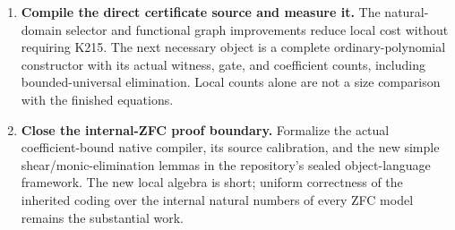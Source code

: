 \documentclass[11pt]{article}
\theoremstyle{definition}
\theoremstyle{remark}
\begin{document}
\begin{enumerate}
\item \textbf{Compile the direct certificate source and measure it.}
The natural-domain selector and functional graph improvements reduce
local cost without requiring K215. The next necessary object is a complete
ordinary-polynomial constructor with its actual witness, gate, and
coefficient counts, including bounded-universal elimination. Local counts
alone are not a size comparison with the finished equations.

\item \textbf{Close the internal-ZFC proof boundary.}
Formalize the actual coefficient-bound native compiler, its source
calibration, and the new simple shear/monic-elimination lemmas in the
repository's sealed object-language framework. The new local algebra is
short; uniform correctness of the inherited coding over the internal
natural numbers of every ZFC model remains the substantial work.
\end{enumerate}
\end{document}
